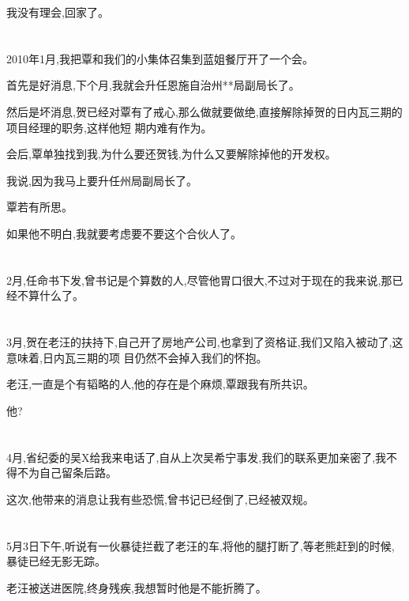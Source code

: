 \documentclass[11pt]{article}
\begin{document}
我没有理会,回家了。



\section{}
2010年1月,我把覃和我们的小集体召集到蓝姐餐厅开了一个会。

首先是好消息,下个月,我就会升任恩施自治州**局副局长了。

然后是坏消息,贺已经对覃有了戒心,那么做就要做绝,直接解除掉贺的日内瓦三期的项目经理的职务,这样他短
期内难有作为。

会后,覃单独找到我,为什么要还贺钱,为什么又要解除掉他的开发权。

我说,因为我马上要升任州局副局长了。

覃若有所思。

如果他不明白,我就要考虑要不要这个合伙人了。



\section{}
2月,任命书下发,曾书记是个算数的人,尽管他胃口很大,不过对于现在的我来说,那已经不算什么了。



\section{}
3月,贺在老汪的扶持下,自己开了房地产公司,也拿到了资格证,我们又陷入被动了,这意味着,日内瓦三期的项
目仍然不会掉入我们的怀抱。

老汪,一直是个有韬略的人,他的存在是个麻烦,覃跟我有所共识。

他?

\section{}
4月,省纪委的吴X给我来电话了,自从上次吴希宁事发,我们的联系更加亲密了,我不得不为自己留条后路。

这次,他带来的消息让我有些恐慌,曾书记已经倒了,已经被双规。

\section{}
5月3日下午,听说有一伙暴徒拦截了老汪的车,将他的腿打断了,等老熊赶到的时候,暴徒已经无影无踪。

老汪被送进医院,终身残疾,我想暂时他是不能折腾了。
\end{document}
